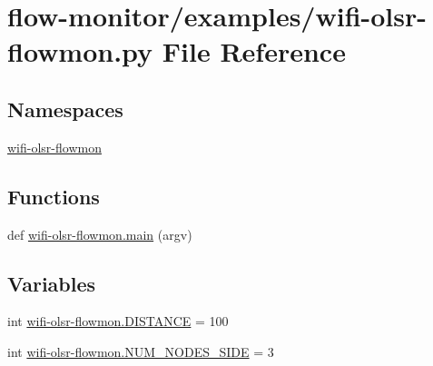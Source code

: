 \hypertarget{wifi-olsr-flowmon_8py}{}\section{flow-\/monitor/examples/wifi-\/olsr-\/flowmon.py File Reference}
\label{wifi-olsr-flowmon_8py}
\subsection*{Namespaces}
\begin{DoxyCompactItemize}
\item 
 \hyperlink{namespacewifi-olsr-flowmon}{wifi-\/olsr-\/flowmon}
\end{DoxyCompactItemize}
\subsection*{Functions}
\begin{DoxyCompactItemize}
\item 
def \hyperlink{namespacewifi-olsr-flowmon_ab8793f3e28ca4a531001056ef52436e4}{wifi-\/olsr-\/flowmon.\+main} (argv)
\end{DoxyCompactItemize}
\subsection*{Variables}
\begin{DoxyCompactItemize}
\item 
int \hyperlink{namespacewifi-olsr-flowmon_af65c2cd2cd1d45451526f8ae740b1f8d}{wifi-\/olsr-\/flowmon.\+D\+I\+S\+T\+A\+N\+CE} = 100
\item 
int \hyperlink{namespacewifi-olsr-flowmon_a8678ef1d936e9b45a294168be101c086}{wifi-\/olsr-\/flowmon.\+N\+U\+M\+\_\+\+N\+O\+D\+E\+S\+\_\+\+S\+I\+DE} = 3
\end{DoxyCompactItemize}
